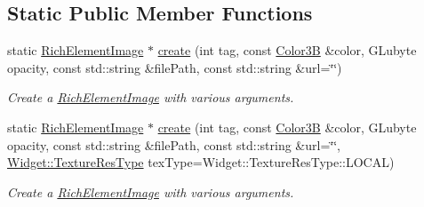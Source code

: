\subsection*{Static Public Member Functions}
\begin{DoxyCompactItemize}
\item 
static \hyperlink{classui_1_1RichElementImage}{Rich\+Element\+Image} $\ast$ \hyperlink{classui_1_1RichElementImage_a760217895f06e2be2c6992599343256f}{create} (int tag, const \hyperlink{structColor3B}{Color3B} \&color, G\+Lubyte opacity, const std\+::string \&file\+Path, const std\+::string \&url=\char`\"{}\char`\"{})
\begin{DoxyCompactList}\small\item\em Create a \hyperlink{classui_1_1RichElementImage}{Rich\+Element\+Image} with various arguments. \end{DoxyCompactList}\item 
static \hyperlink{classui_1_1RichElementImage}{Rich\+Element\+Image} $\ast$ \hyperlink{classui_1_1RichElementImage_a7415ee5fb584b5a1ee29bc32ea7e9dd0}{create} (int tag, const \hyperlink{structColor3B}{Color3B} \&color, G\+Lubyte opacity, const std\+::string \&file\+Path, const std\+::string \&url=\char`\"{}\char`\"{}, \hyperlink{classui_1_1Widget_a040a65ec5ad3b11119b7e16b98bd9af0}{Widget\+::\+Texture\+Res\+Type} tex\+Type=Widget\+::\+Texture\+Res\+Type\+::\+L\+O\+C\+AL)
\begin{DoxyCompactList}\small\item\em Create a \hyperlink{classui_1_1RichElementImage}{Rich\+Element\+Image} with various arguments. \end{DoxyCompactList}\end{DoxyCompactItemize}
